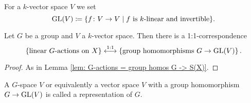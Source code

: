 For a $k$-vector space $V$ we set
\[
 \operatorname{GL}(V) \coloneqq \{f \colon V \to V \mid f \text{ is $k$-linear and invertible}\}.
\]


\begin{lem}
 Let $G$ be a group and $V$ a $k$-vector space. Then there is a 1:1-correspondence
 \[
    \left\{\text{linear $G$-actions on $X$}\right\}
  \overset{1:1}{\longleftrightarrow}
  \left\{\text{group homomorphisms $G \to \operatorname{GL}(V)$}\right\}.
 \]
\end{lem}
\begin{proof}
 As in Lemma \ref{lem: G-actions = group homos G -> S(X)}.
\end{proof}


\begin{rem}
 A $G$-space $V$ or equivalently a vector space $V$ with a group homomorphism $G \to \operatorname{GL}(V)$ is called a representation of $G$.
\end{rem}


